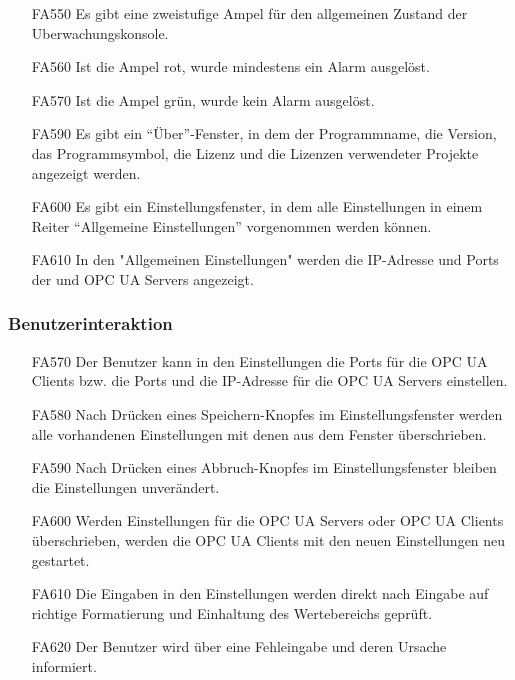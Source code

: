 \documentclass[parskip=full]{scrartcl}
\begin{document}
\begin{enumerate}
  \item[FA550] Es gibt eine zweistufige Ampel für den allgemeinen Zustand der \gls{Uberwachungskonsole}.
  \item[FA560] Ist die Ampel rot, wurde mindestens ein Alarm ausgelöst.
  \item[FA570] Ist die Ampel grün, wurde kein Alarm ausgelöst.
  \item[FA590] Es gibt ein "`Über"'-Fenster, in dem der Programmname, die Version, das Programmsymbol, die Lizenz und die Lizenzen verwendeter Projekte angezeigt werden.
  \item[FA600] Es gibt ein Einstellungsfenster, in dem alle Einstellungen in einem Reiter "`Allgemeine Einstellungen"' vorgenommen werden können.
  \item[FA610] In den "Allgemeinen Einstellungen" werden die IP-Adresse und Ports der  und \glspl{OPC UA Server} angezeigt.
\end{enumerate}

\subsubsection{Benutzerinteraktion}
\begin{enumerate}
  \item[FA570] Der Benutzer kann in den Einstellungen die Ports für die \glspl{OPC UA Client} bzw. die Ports und die IP-Adresse für die \glspl{OPC UA Server} einstellen.
  \item[FA580] Nach Drücken eines Speichern-Knopfes im Einstellungsfenster werden alle vorhandenen Einstellungen mit denen aus dem Fenster überschrieben.
  \item[FA590] Nach Drücken eines Abbruch-Knopfes im Einstellungsfenster bleiben die Einstellungen unverändert.
  \item[FA600] Werden Einstellungen für die \glspl{OPC UA Server} oder \glspl{OPC UA Client} überschrieben, werden die \glspl{OPC UA Client} mit den neuen Einstellungen neu gestartet.
  \item[FA610] Die Eingaben in den Einstellungen werden direkt nach Eingabe auf richtige Formatierung und Einhaltung des Wertebereichs gepr\"uft.
  \item[FA620] Der Benutzer wird über eine Fehleingabe und deren Ursache informiert.
\end{enumerate}
\end{document}
